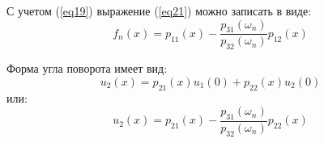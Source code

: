 С учетом (\ref{eq19}) выражение (\ref{eq21}) можно записать в виде:
\begin{equation}
    \label{eq22}
    f_n(x) = p_{11}(x) - \frac{p_{31}(\omega_n)}{p_{32}(\omega_n)} p_{12}(x)
\end{equation}

Форма угла поворота имеет вид:
\begin{equation}
    \label{eq23}
    u_2(x) = p_{21}(x) u_1(0) + p_{22}(x) u_2(0)
\end{equation}
или:
\begin{equation}
    \label{eq24}
    u_2(x) = p_{21}(x) - \frac{p_{31}(\omega_n)}{p_{32}(\omega_n)} p_{22}(x)
\end{equation}